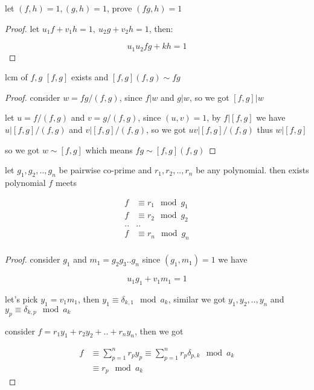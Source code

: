 \begin{exercise}
    let $(f,h) = 1, (g,h) = 1$, prove $(fg, h) = 1$
\end{exercise}

\begin{proof}
    let $u_1f + v_1h =1,\: u_2g + v_2h = 1$, then:

    \[
        u_1u_2fg + kh = 1
    \]
\end{proof}

\begin{exercise}
    lcm of $f,g$ $[f,g]$ exists and $[f,g](f,g) \sim fg$
\end{exercise}

\begin{proof}
    consider $w = fg/(f,g)$, since $f| w $ and $g| w$, so we got $[f,g] | w$

    let $u = f/(f,g)$ and $v = g/(f,g)$, since $(u,v) = 1$, by $f | [f,g]$ we have $u | [f,g]/(f,g)$
    and $v | [f,g]/(f,g)$, so we got $uv | [f,g]/(f,g)$ thus $w | [f,g]$

    so we got $w \sim [f,g]$ which means $fg \sim [f,g](f,g)$
\end{proof}

\begin{exercise}
    let $g_1,g_2,..,g_n$ be pairwise co-prime and $r_1,r_2,..,r_n$ be any polynomial. then exists polynomial  $f$ meets

    \begin{align*}
        f &\equiv r_1 \mod g_1 \\
        f &\equiv r_2 \mod g_2 \\
        .. & ..  \\
        f &\equiv r_n \mod g_n \\
    \end{align*}
\end{exercise}

\begin{proof}
    consider $g_1$ and $m_1 = g_2g_3..g_n$ since $(g_1,m_1) = 1$ we have

    \[
        u_1g_1 + v_1m_1 = 1
    \]

    let's pick $y_1 = v_1m_1$, then $y_1 \equiv \delta_{k,1} \mod a_k$, similar we got
    $y_1,y_2,..,y_n$ and $y_p \equiv \delta_{k,p} \mod a_k$

    consider $f = r_1y_1 + r_2y_2 + .. + r_ny_n$, then we got

    \begin{align*}
        f &\equiv \sum_{p=1}^{n}r_py_p \equiv \sum_{p=1}^{n}r_p \delta_{p,k} \mod a_k \\
        & \equiv r_p \mod a_k
    \end{align*}
\end{proof}

